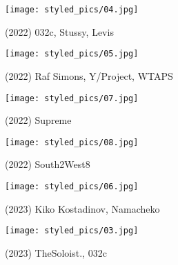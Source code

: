 \begin{minipage}[h!]{0.5\textwidth}
    \begin{figure}[H]
        \texttt{[image: styled\_pics/04.jpg]}
        \caption*{(2022) 032c, Stussy, Levis}
    \end{figure}
\end{minipage}
\begin{minipage}[h!]{0.5\textwidth}
    \begin{figure}[H]
        \texttt{[image: styled\_pics/05.jpg]}
        \caption*{(2022) Raf Simons, Y/Project, WTAPS}
    \end{figure}
\end{minipage}
\begin{minipage}[h!]{0.5\textwidth}
    \begin{figure}[H]
        \texttt{[image: styled\_pics/07.jpg]}
        \caption*{(2022) Supreme}
    \end{figure}
\end{minipage}
\begin{minipage}[h!]{0.5\textwidth}
    \begin{figure}[H]
        \texttt{[image: styled\_pics/08.jpg]}
        \caption*{(2022) South2West8}
    \end{figure}
\end{minipage}
\begin{minipage}[h!]{0.5\textwidth}
    \begin{figure}[H]
        \texttt{[image: styled\_pics/06.jpg]}
        \caption*{(2023) Kiko Kostadinov, Namacheko}
    \end{figure}
\end{minipage}
\begin{minipage}[h!]{0.5\textwidth}
    \begin{figure}[H]
        \texttt{[image: styled\_pics/03.jpg]}
        \caption*{(2023) TheSoloist., 032c}
    \end{figure}
\end{minipage}
